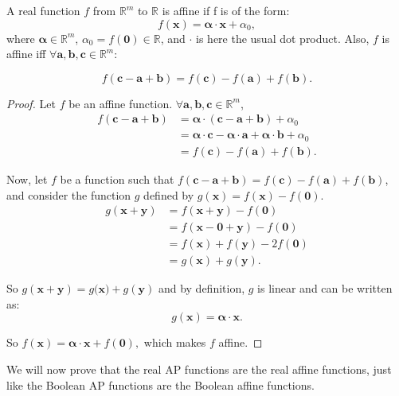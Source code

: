 \begin{property}
  \label{PROPRE:f_affine_real}
  A real function $f$ from $\mathbb{R}^m$ to $\mathbb{R}$ is affine if f is of
  the form: $$f(\mathbf{x}) = \boldsymbol{\alpha} \cdot \mathbf{x} +
  \alpha_0,$$
  where $\boldsymbol{\alpha} \in \mathbb{R}^m$, $\alpha_0  = f(\mathbf{0})
  \in \mathbb{R}$, and $\cdot$ is here the usual dot product.  Also, $f$ is affine iff $\forall \mathbf{a}, \mathbf{b},
  \mathbf{c} \in
  \mathbb{R}^m$:

  $$f(\mathbf{c} - \mathbf{a} + \mathbf{b}) = f(\mathbf{c}) - f(\mathbf{a}) +
  f(\mathbf{b}).$$
\end{property}
\begin{proof}
  Let $f$ be an affine function.
  $\forall \mathbf{a}, \mathbf{b}, \mathbf{c} \in \mathbb{R}^m$,
  \begin{align*}
    f(\mathbf{c} - \mathbf{a} + \mathbf{b}) &= \boldsymbol{\alpha} \cdot (\mathbf{c}
    - \mathbf{a} + \mathbf{b}) + \alpha_0\\
    &= \boldsymbol{\alpha} \cdot \mathbf{c} - \boldsymbol{\alpha} \cdot
    \mathbf{a} + \boldsymbol{\alpha} \cdot \mathbf{b} + \alpha_0\\
    &= f(\mathbf{c}) - f(\mathbf{a}) + f(\mathbf{b}).
  \end{align*}

  Now, let $f$ be a function such that $f(\mathbf{c} - \mathbf{a} +
  \mathbf{b}) = f(\mathbf{c}) - f(\mathbf{a}) + f(\mathbf{b})$, and consider
  the function $g$ defined by $g(\mathbf{x}) = f(\mathbf{x}) - f(\mathbf{0}).$
  \begin{align*}
    g(\mathbf{x} + \mathbf{y}) &= f(\mathbf{x} + \mathbf{y}) - f(\mathbf{0})\\
    &= f(\mathbf{x} - \mathbf{0} + \mathbf{y}) - f(\mathbf{0})\\
    &= f(\mathbf{x}) + f(\mathbf{y}) - 2f(\mathbf{0})\\
    &= g(\mathbf{x}) + g(\mathbf{y}).
  \end{align*}

  So $g(\mathbf{x} + \mathbf{y}) = g(\mathbf{x)} + g(\mathbf{y})$ and by
  definition, $g$ is linear and can be written as:
  $$g(\mathbf{x}) = \boldsymbol{\alpha} \cdot \mathbf{x}.$$

  So $f(\mathbf{x}) = \boldsymbol{\alpha} \cdot \mathbf{x} + f(\mathbf{0}),$
  which makes $f$ affine.
\end{proof}

We will now prove that the real AP functions are the real affine functions, just
like the Boolean AP functions are the Boolean affine functions.

